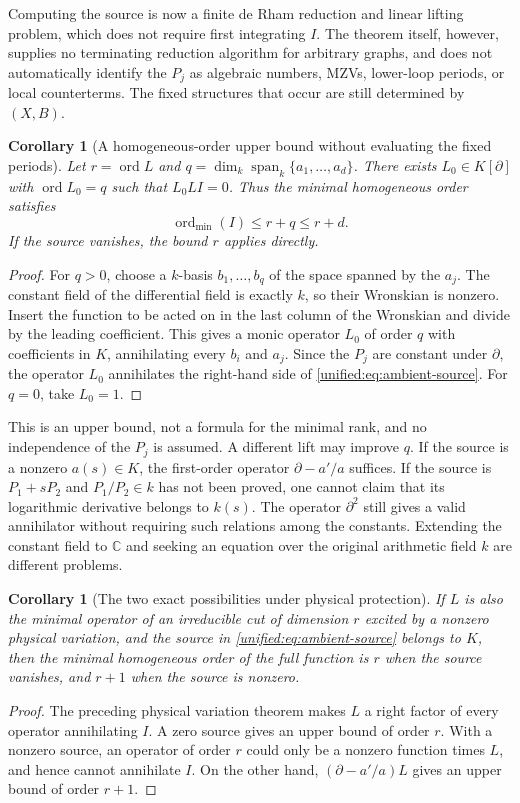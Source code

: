 \documentclass[11pt,a4paper,oneside]{article}
\theoremstyle{plain}
\newtheorem{corollary}[theorem]{Corollary}
\theoremstyle{definition}
\theoremstyle{remark}
\numberwithin{equation}{section}
\begin{document}
Computing the source is now a finite de Rham reduction and linear lifting problem,
which does not require first integrating $I$.
The theorem itself, however, supplies no terminating reduction algorithm for arbitrary graphs,
and does not automatically identify the $P_j$ as algebraic numbers, MZVs, lower-loop periods, or local counterterms.
The fixed structures that occur are still determined by $(X,B)$.

\begin{corollary}[A homogeneous-order upper bound without evaluating the fixed periods]\label{unified:cor:ambient-order}
Let $r=\operatorname{ord}L$ and
$q=\dim_k\operatorname{span}_k\{a_1,\ldots,a_d\}$.
There exists $L_0\in K[\partial]$ with $\operatorname{ord}L_0=q$
such that $L_0LI=0$. Thus the minimal homogeneous order satisfies
\[
 \operatorname{ord}_{\min}(I)\le r+q\le r+d.
\]
If the source vanishes, the bound $r$ applies directly.
\end{corollary}
\begin{proof}
For $q>0$, choose a $k$-basis $b_1,\ldots,b_q$ of the space spanned by the $a_j$.
The constant field of the differential field is exactly $k$, so their Wronskian is nonzero.
Insert the function to be acted on in the last column of the Wronskian and divide by the leading coefficient.
This gives a monic operator $L_0$ of order $q$ with coefficients in $K$, annihilating every $b_i$ and $a_j$.
Since the $P_j$ are constant under $\partial$, the operator $L_0$ annihilates the right-hand side of \eqref{unified:eq:ambient-source}.
For $q=0$, take $L_0=1$.
\end{proof}

This is an upper bound, not a formula for the minimal rank, and no independence of the $P_j$ is assumed.
A different lift may improve $q$.
If the source is a nonzero $a(s)\in K$, the first-order operator $\partial-a'/a$ suffices.
If the source is $P_1+sP_2$ and $P_1/P_2\in k$ has not been proved,
one cannot claim that its logarithmic derivative belongs to $k(s)$.
The operator $\partial^2$ still gives a valid annihilator without requiring such relations among the constants.
Extending the constant field to $\mathbb C$ and seeking an equation over the original arithmetic field $k$ are different problems.

\begin{corollary}[The two exact possibilities under physical protection]\label{unified:cor:ambient-exact}
If $L$ is also the minimal operator of an irreducible cut of dimension $r$ excited by a nonzero physical variation,
and the source in \eqref{unified:eq:ambient-source} belongs to $K$,
then the minimal homogeneous order of the full function is $r$ when the source vanishes,
and $r+1$ when the source is nonzero.
\end{corollary}
\begin{proof}
The preceding physical variation theorem makes $L$ a right factor of every operator annihilating $I$.
A zero source gives an upper bound of order $r$.
With a nonzero source, an operator of order $r$ could only be a nonzero function times $L$, and hence cannot annihilate $I$.
On the other hand, $(\partial-a'/a)L$ gives an upper bound of order $r+1$.
\end{proof}
\end{document}
